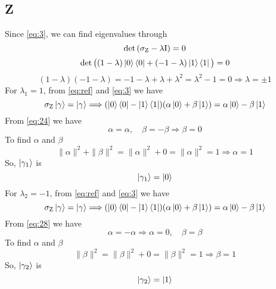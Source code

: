 \documentclass[12pt]{article}
\begin{document}
\subsection{Z}
Since \ref{eq:3}, we can find eigenvalues through
\begin{equation}
\det{(\sigma_{\textnormal{Z}} - \lambda\textnormal{I})} = 0
\end{equation}
\begin{equation*}
\det{\big((1-\lambda)\ket{0}\bra{0} + (-1-\lambda)\ket{1}\bra{1}\big)} = 0
\end{equation*}
\begin{equation*}
    (1-\lambda)(-1-\lambda) = -1 - \lambda + \lambda + \lambda^2 = \lambda^2 -1 = 0 \Longrightarrow \lambda = \pm 1
\end{equation*}
For $\lambda_1 = 1$, from \ref{eq:ref} and \ref{eq:3} we have
\begin{equation}
    \label{eq:24}
    \sigma_{\textnormal{Z}}\ket{\gamma} = \ket{\gamma} \Longrightarrow (\ket{0}\bra{0} - \ket{1}\bra{1})(\alpha\ket{0}+\beta\ket{1}) = \alpha\ket{0}-\beta\ket{1}
\end{equation}
From \ref{eq:24} we have
\begin{equation}
    \alpha = \alpha, \quad \beta = -\beta \Longrightarrow \beta = 0
\end{equation}
To find $\alpha$ and $\beta$
\begin{equation}
    \|\alpha\|^2 + \|\beta\|^2 = \|\alpha\|^2 + 0 = \|\alpha\|^2 = 1 \Longrightarrow \alpha = 1
\end{equation}
So, $\ket{\gamma_{1}}$ is
\begin{equation}
    \ket{\gamma_{1}} = \ket{0}
\end{equation}
For $\lambda_2 = -1$, from \ref{eq:ref} and \ref{eq:3} we have
\begin{equation}
    \label{eq:28}
    \sigma_{\textnormal{Z}}\ket{\gamma} = \ket{\gamma} \Longrightarrow (\ket{0}\bra{0} - \ket{1}\bra{1})(\alpha\ket{0}+\beta\ket{1}) = \alpha\ket{0}-\beta\ket{1}
\end{equation}
From \ref{eq:28} we have
\begin{equation}
    \alpha = -\alpha \Longrightarrow \alpha = 0, \quad \beta = \beta
\end{equation}
To find $\alpha$ and $\beta$
\begin{equation}
\|\beta\|^2 = \|\beta\|^2 + 0 = \|\beta\|^2 = 1 \Longrightarrow \beta = 1
\end{equation}
So, $\ket{\gamma_{2}}$ is
\begin{equation}
    \ket{\gamma_{2}} = \ket{1}
\end{equation}
\end{document}
